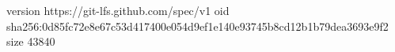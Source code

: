 version https://git-lfs.github.com/spec/v1
oid sha256:0d85fc72e8e67c53d417400e054d9ef1e140e93745b8cd12b1b79dea3693e9f2
size 43840
